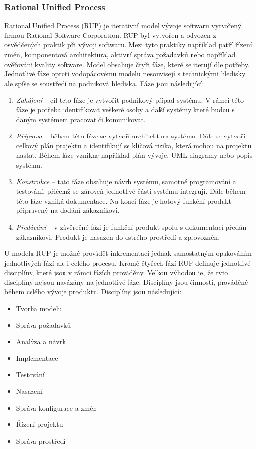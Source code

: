 \documentclass[czech,master,public,dept460,male,cpdeclaration,oneside]{diploma}
\begin{document}
\subsubsection{Rational Unified Process}
Rational Unified Process (RUP) je iterativní model vývoje softwaru vytvořený firmou Rational Software Corporation. RUP byl vytvořen a odvozen z osvědčených praktik při vývoji softwaru. Mezi tyto praktiky například patří řízení změn, komponentová architektura, aktivní správa požadavků nebo například ověřování kvality software. Model obsahuje čtyři fáze, které se iterují dle potřeby. Jednotlivé fáze oproti vodopádovému modelu nesouvisejí s technickými hledisky ale spíše se soustředí na podniková hlediska. \cite{ref:rup_ibm_about} Fáze jsou následující:

\begin{enumerate}
\item \textit{Zahájení} -- cíl této fáze je vytvořit podnikový případ systému. V rámci této fáze je potřeba identifikovat veškeré osoby a další systémy které budou s daným systémem pracovat či komunikovat.
\item \textit{Příprava} -- během této fáze se vytvoří architektura systému. Dále se vytvoří celkový plán projektu a identifikují se klíčová rizika, která mohou na projektu nastat. Během fáze vznikne například plán vývoje, UML diagramy nebo popis systému.
\item \textit{Konstrukce} -- tato fáze obsahuje návrh systému, samotné programování a testování, přičemž se zároveň jednotlivé části systému integrují. Dále během této fáze vzniká dokumentace. Na konci fáze je hotový funkční produkt připravený na dodání zákazníkovi.
\item \textit{Předávání} -- v závěrečné fázi je funkční produkt spolu s dokumentací předán zákazníkovi. Produkt je nasazen do ostrého prostředí a zprovozněn.
\end{enumerate}

U modelu RUP je možné provádět inkrementaci jednak samostatným opakováním jednotlivých fází ale i celého procesu. Kromě čtyřech fází RUP definuje jednotlivé disciplíny, které jsou v rámci fázích prováděny. Velkou výhodou je, že tyto disciplíny nejsou navázány na jednotlivé fáze. Disciplíny jsou činnosti, prováděné během celého vývoje produktu. Disciplíny jsou následující:

\begin{itemize}
\item Tvorba modelu
\item Správa požadavků
\item Analýza a návrh
\item Implementace
\item Testování
\item Nasazení
\item Správa konfigurace a změn
\item Řízení projektu
\item Správa prostředí 
\end{itemize}
\end{document}

